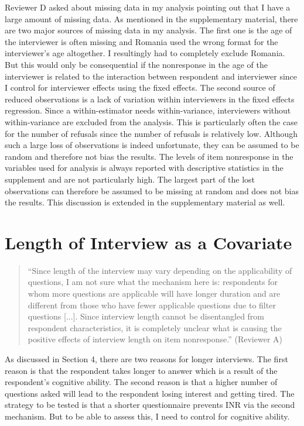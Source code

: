 \documentclass[a4paper, 12pt]{article}
\begin{document}
Reviewer D asked about missing data in my analysis pointing out that I have a large amount of missing data. As mentioned in the supplementary material, there are two major sources of missing data in my analysis. The first one is the age of the interviewer is often missing and Romania used the wrong format for the interviewer's age altogether. I resultingly had to completely exclude Romania. But this would only be consequential if the nonresponse in the age of the interviewer is related to the interaction between respondent and interviewer since I control for interviewer effects using the fixed effects. The second source of reduced observations is a lack of variation within interviewers in the fixed effects regression. Since a within-estimator needs within-variance, interviewers without within-variance are excluded from the analysis. This is particularly often the case for the number of refusals since the number of refusals is relatively low. Although such a large loss of observations is indeed unfortunate, they can be assumed to be random and therefore not bias the results. The levels of item nonresponse in the variables used for analysis is always reported with descriptive statistics in the supplement and are not particularly high. The largest part of the lost observations can therefore be assumed to be missing at random and does not bias the results. This discussion is extended in the supplementary material as well.

\section{Length of Interview as a Covariate}

\begin{quotation}
 ``Since length of the interview may vary depending on the applicability of questions, I am not sure what the mechanism here is: respondents for whom more questions are applicable will have longer duration and are different from those who have fewer applicable questions due to filter questions [...]. Since interview length cannot be disentangled from respondent characteristics, it is completely unclear what is causing the positive effects of interview length on item nonresponse.'' (Reviewer A)
\end{quotation}

As discussed in Section 4, there are two reasons for longer interviews. The first reason is that the respondent takes longer to answer which is a result of the respondent's cognitive ability. The second reason is that a higher number of questions asked will lead to the respondent losing interest and getting tired. The strategy to be tested is that a shorter questionnaire prevents INR via the second mechanism. But to be able to assess this, I need to control for cognitive ability.
\end{document}
